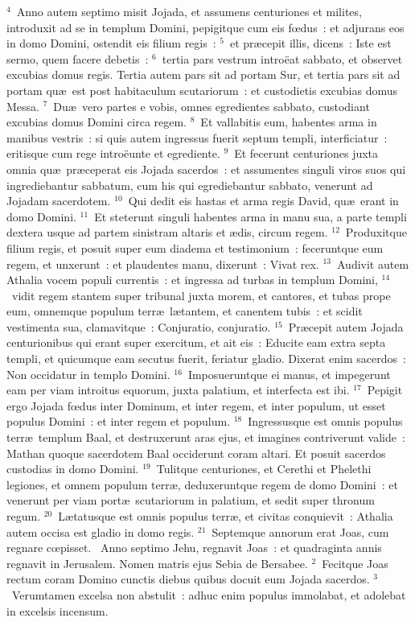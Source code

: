 ${}^{4}$~Anno autem septimo misit Jojada, et assumens centuriones et milites, introduxit ad se in templum Domini, pepigitque cum eis fœdus~: et adjurans eos in domo Domini, ostendit eis filium regis~:
${}^{5}$~et pr\ae cepit illis, dicens~: Iste est sermo, quem facere debetis~:
${}^{6}$~tertia pars vestrum intro\"eat sabbato, et observet excubias domus regis. Tertia autem pars sit ad portam Sur, et tertia pars sit ad portam qu\ae\ est post habitaculum scutariorum~: et custodietis excubias domus Messa.
${}^{7}$~Du\ae\ vero partes e vobis, omnes egredientes sabbato, custodiant excubias domus Domini circa regem.
${}^{8}$~Et vallabitis eum, habentes arma in manibus vestris~: si quis autem ingressus fuerit septum templi, interficiatur~: eritisque cum rege intro\"eunte et egrediente.
${}^{9}$~Et fecerunt centuriones juxta omnia qu\ae\ pr\ae ceperat eis Jojada sacerdos~: et assumentes singuli viros suos qui ingrediebantur sabbatum, cum his qui egrediebantur sabbato, venerunt ad Jojadam sacerdotem.
${}^{10}$~Qui dedit eis hastas et arma regis David, qu\ae\ erant in domo Domini.
${}^{11}$~Et steterunt singuli habentes arma in manu sua, a parte templi dextera usque ad partem sinistram altaris et \ae dis, circum regem.
${}^{12}$~Produxitque filium regis, et posuit super eum diadema et testimonium~: feceruntque eum regem, et unxerunt~: et plaudentes manu, dixerunt~: Vivat rex.
${}^{13}$~Audivit autem Athalia vocem populi currentis~: et ingressa ad turbas in templum Domini,
${}^{14}$~vidit regem stantem super tribunal juxta morem, et cantores, et tubas prope eum, omnemque populum terr\ae\ l\ae tantem, et canentem tubis~: et scidit vestimenta sua, clamavitque~: Conjuratio, conjuratio.
${}^{15}$~Pr\ae cepit autem Jojada centurionibus qui erant super exercitum, et ait eis~: Educite eam extra septa templi, et quicumque eam secutus fuerit, feriatur gladio. Dixerat enim sacerdos~: Non occidatur in templo Domini.
${}^{16}$~Imposueruntque ei manus, et impegerunt eam per viam introitus equorum, juxta palatium, et interfecta est ibi.
${}^{17}$~Pepigit ergo Jojada fœdus inter Dominum, et inter regem, et inter populum, ut esset populus Domini~: et inter regem et populum.
${}^{18}$~Ingressusque est omnis populus terr\ae\ templum Baal, et destruxerunt aras ejus, et imagines contriverunt valide~: Mathan quoque sacerdotem Baal occiderunt coram altari. Et posuit sacerdos custodias in domo Domini.
${}^{19}$~Tulitque centuriones, et Cerethi et Phelethi legiones, et omnem populum terr\ae , deduxeruntque regem de domo Domini~: et venerunt per viam port\ae\ scutariorum in palatium, et sedit super thronum regum.
${}^{20}$~L\ae tatusque est omnis populus terr\ae , et civitas conquievit~: Athalia autem occisa est gladio in domo regis.
${}^{21}$~Septemque annorum erat Joas, cum regnare cœpisset.
~Anno septimo Jehu, regnavit Joas~: et quadraginta annis regnavit in Jerusalem. Nomen matris ejus Sebia de Bersabee.
${}^{2}$~Fecitque Joas rectum coram Domino cunctis diebus quibus docuit eum Jojada sacerdos.
${}^{3}$~Verumtamen excelsa non abstulit~: adhuc enim populus immolabat, et adolebat in excelsis incensum.


